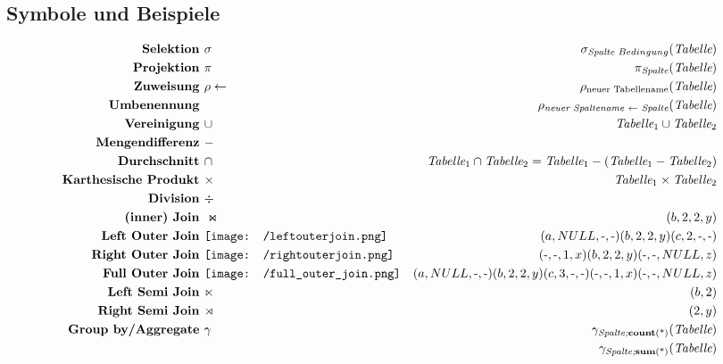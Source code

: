 \documentclass{article}
\newcommand{\fullouterjoin}{\texttt{[image: /full\_outer\_join.png]}}
\newcommand{\leftouterjoin}{\texttt{[image: /leftouterjoin.png]}}
\newcommand{\rightouterjoin}{\texttt{[image: /rightouterjoin.png]}}
\begin{document}
		\subsection*{Symbole und Beispiele}
			\begin{align*}
				\textbf{Selektion } & \sigma & \sigma_{\textit{Spalte }Bedingung}(\textit{Tabelle})\\
				\textbf{Projektion } & \pi & \pi_{\textit{Spalte}}(\textit{Tabelle})\\
				\textbf{Zuweisung } & \rho \leftarrow & \rho_{\text{neuer Tabellename}}(\textit{Tabelle})\\
				\textbf{Umbenennung } & & \rho_{\textit{neuer Spaltename } \leftarrow \textit{ Spalte}}(\textit{Tabelle})\\
				\textbf{Vereinigung } & \cup & \textit{Tabelle$_1$} \cup \textit{Tabelle$_2$}\\
				\textbf{Mengendifferenz } & - & \\
				\textbf{Durchschnitt } & \cap & \textit{Tabelle$_1$} \cap \textit{Tabelle$_2$} = \textit{Tabelle$_1$} - (\textit{Tabelle$_1$} - \textit{Tabelle$_2$})\\
				\textbf{Karthesische Produkt } & \times & \textit{Tabelle$_1$} \times \textit{Tabelle$_2$}\\
				\textbf{Division } & \div & \\
				\textbf{(inner) Join } & \Join & (b,2,2,y)\\
				\textbf{Left Outer Join } & \leftouterjoin & (a,NULL,\text{-},\text{-})(b,2,2,y)(c,2,\text{-},\text{-})\\
				\textbf{Right Outer Join } & \rightouterjoin & (\text{-},\text{-},1,x)(b,2,2,y)(\text{-},\text{-},NULL,z)\\
				\textbf{Full Outer Join } & \fullouterjoin & (a,NULL,\text{-},\text{-})(b,2,2,y)(c,3,\text{-},\text{-})(\text{-},\text{-},1,x)(\text{-},\text{-},NULL,z)\\
				\textbf{Left Semi Join } & \ltimes & (b,2)\\
				\textbf{Right Semi Join } & \rtimes & (2,y)\\
				\textbf{Group by/Aggregate } & \gamma & \gamma_\text{\textit{Spalte;}\textbf{count}(*)}(\textit{Tabelle})\\
				& & \gamma_{\text{\textit{Spalte;}\textbf{sum}(*)}}(\textit{Tabelle})
			\end{align*}
\end{document}
